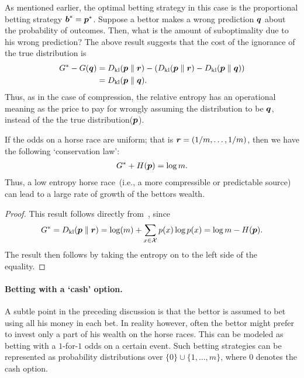     \begin{remark}
        As mentioned earlier, the optimal betting strategy in this case is the proportional betting strategy $\boldsymbol{b}^* = \boldsymbol{p}^*$. Suppose a bettor makes a wrong prediction $\boldsymbol{q}$ about the probability of outcomes. Then, what is the amount of suboptimality due to his wrong prediction? The above result suggests that the cost of the ignorance of the true distribution is 
        \begin{align}
            G^* - G(\boldsymbol{q}) &= D_{\text{kl}}(\boldsymbol{p} \parallel \boldsymbol{r}) - \left( D_{\text{kl}}(\boldsymbol{p} \parallel \boldsymbol{r}) - D_{\text{kl}}(\boldsymbol{p} \parallel \boldsymbol{q}) \right)  \\
            & = D_{\text{kl}} (\boldsymbol{p} \parallel  \boldsymbol{q}). 
        \end{align}
        Thus, as in the case of compression, the relative entropy has an operational meaning as the price to pay for wrongly assuming the distribution to be $\boldsymbol{q}$, instead of the the true distribution($\boldsymbol{p}$). 
    \end{remark}

    \begin{corollary}
        \label{corollary:uniform-odds} If the odds on a horse race are uniform; that is $\boldsymbol{r} = (1/m, \ldots, 1/m)$, then we have the following `conservation law': 
        \begin{align}
            G^* + H(\boldsymbol{p}) = \log m. 
        \end{align}
        Thus, a low entropy horse race~(i.e., a more compressible or predictable source) can lead to a large rate of growth of the bettors wealth. 
    \end{corollary}

    \begin{proof}
        This result follows directly from~, since    
        \begin{align}
            G^* = D_{\text{kl}}(\boldsymbol{p} \parallel \boldsymbol{r}) = \log(m) +  \sum_{x \in \mathcal{X}} p(x) \log p(x)  = \log m - H(\boldsymbol{p}). 
        \end{align}
        The result then follows by taking the entropy on to the left side of the equality. 
    \end{proof}

    \paragraph{Betting with a `cash' option.} A subtle point in the preceding  discussion is that the bettor is assumed to bet using all his money in each bet. In reality however, often the bettor might prefer to invest only a part of his wealth on the horse races. This can be modeled as betting with a $1$-for-$1$ odds on a certain event. Such betting strategies can be represented as probability distributions over $\{0\} \cup \{1, \ldots, m\}$, where $0$ denotes the cash option. 

